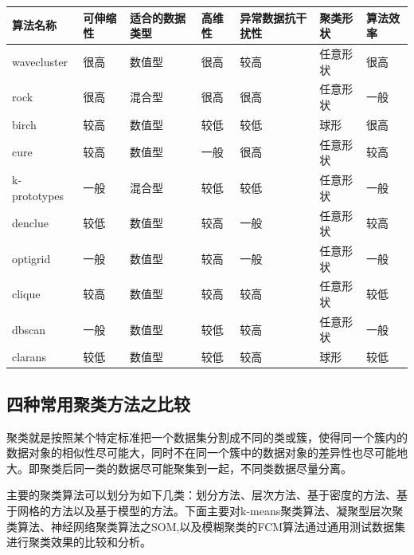 \begin{table}[h]
	\centering
	\begin{tabular}{|p{}|p{}|p{}|p{}|p{}|p{}|p{}|}\hline
   算法名称   & 可伸缩性 & 适合的数据类型 & 高维性 & 异常数据抗干扰性 & 聚类形状 & 算法效率\\\hline
 {\scriptsize wavecluster } &   很高   &     数值型     &  很高  &       较高       & 任意形状 &   很高  \\\hline
 {\scriptsize     rock    } &   很高   &     混合型     &  很高  &       很高       & 任意形状 &   一般  \\\hline
 {\scriptsize    birch    } &   较高   &     数值型     &  较低  &       较低       &   球形   &   很高  \\\hline
 {\scriptsize     cure    } &   较高   &     数值型     &  一般  &       很高       & 任意形状 &   较高  \\\hline
 {\scriptsize k-prototypes} &   一般   &     混合型     &  较低  &       较低       & 任意形状 &   一般  \\\hline
 {\scriptsize   denclue   } &   较低   &     数值型     &  较高  &       一般       & 任意形状 &   较高  \\\hline
 {\scriptsize   optigrid  } &   一般   &     数值型     &  较高  &       一般       & 任意形状 &   一般  \\\hline
 {\scriptsize    clique   } &   较高   &     数值型     &  较高  &       较高       & 任意形状 &   较低  \\\hline
 {\scriptsize    dbscan   } &   一般   &     数值型     &  较低  &       较高       & 任意形状 &   一般  \\\hline
 {\scriptsize   clarans   } &   较低   &     数值型     &  较低  &       较高       &   球形   &   较低  \\\hline
	\end{tabular}
\end{table}

\subsection{四种常用聚类方法之比较}

聚类就是按照某个特定标准把一个数据集分割成不同的类或簇，使得同一个簇内的数据对象的相似性尽可能大，同时不在同一个簇中的数据对象的差异性也尽可能地大。即聚类后同一类的数据尽可能聚集到一起，不同类数据尽量分离。

主要的聚类算法可以划分为如下几类：划分方法、层次方法、基于密度的方法、基于网格的方法以及基于模型的方法。下面主要对k-means聚类算法、凝聚型层次聚类算法、神经网络聚类算法之SOM,以及模糊聚类的FCM算法通过通用测试数据集进行聚类效果的比较和分析。

